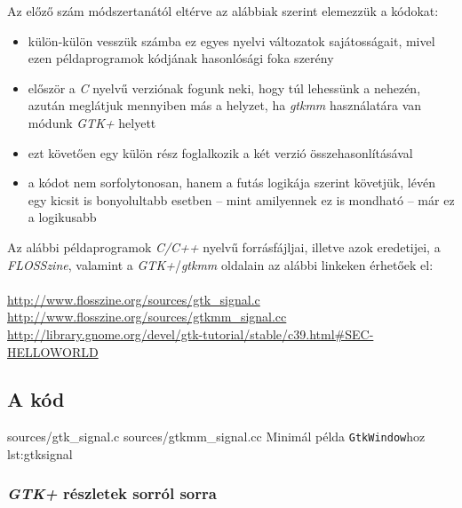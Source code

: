 Az előző szám módszertanától eltérve az alábbiak szerint elemezzük a kódokat:

\begin{itemize}
 \item külön-külön vesszük számba ez egyes nyelvi változatok sajátosságait, mivel ezen példaprogramok kódjának hasonlósági foka szerény
 \item először a \textit{C} nyelvű verziónak fogunk neki, hogy túl lehessünk a nehezén, azután meglátjuk mennyiben más a helyzet, ha \textit{gtkmm} használatára van módunk \textit{GTK+} helyett
 \item ezt követően egy külön rész foglalkozik a két verzió összehasonlításával
 \item a kódot nem sorfolytonosan, hanem a futás logikája szerint követjük, lévén egy kicsit is bonyolultabb esetben -- mint amilyennek ez is mondható -- már ez a logikusabb
\end{itemize}

Az alábbi példaprogramok \textit{C/C++} nyelvű forrásfájljai, illetve azok eredetijei, a \textit{FLOSSzine}, valamint a \textit{GTK+}/\textit{gtkmm} oldalain az alábbi linkeken érhetőek el:
\ \\\\
\url{http://www.flosszine.org/sources/gtk_signal.c}\\
\url{http://www.flosszine.org/sources/gtkmm_signal.cc}\\
\url{http://library.gnome.org/devel/gtk-tutorial/stable/c39.html#SEC-HELLOWORLD}\\

\subsection{A kód}

\lstinputsources
{sources/gtk_signal.c}
{sources/gtkmm_signal.cc}
{Minimál példa \texttt{GtkWindow}hoz}
{lst:gtksignal}

\subsubsection{\textit{GTK+} részletek sorról sorra}

